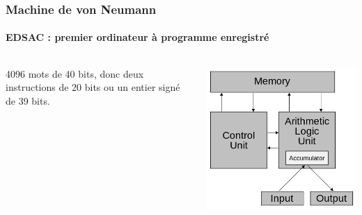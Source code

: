 \documentclass[utf8,10pt]{beamer}
\begin{document}
\begin{frame}
    \frametitle{Machine de von Neumann}
    \framesubtitle{EDSAC : premier ordinateur à programme enregistré}
     
     \begin{columns}
    \begin{column}{0.5\textwidth}
        \begin{description}
            \item [Mémoire :] 4096 mots de 40 bits, donc deux instructions de 20 bits ou un entier signé de
            39 bits.
            \item 
        \end{description}

    \end{column}
    
    \begin{column}{0.5\textwidth}
        \includegraphics[scale=0.4]{./images/Von_Neumann_architecture}
    \end{column}
    \end{columns}
    
\end{frame}
\end{document}
